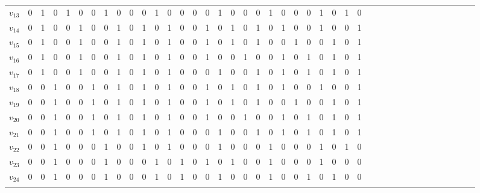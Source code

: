 \begin{table*}
\begin{center}
\begin{tabular}{ccccccccccccccccccccccccccccccccccccccccc}
$v_{13}$&0 & 1 &  0 &  1 &  0 &  0 &  1 &  0 &  0 & 0 & 1 & 0 & 0 & 0 & 0 & 1 & 0 & 0 & 0 & 1 & 0 & 0 & 0 & 1 & 0 & 1 & 0 \\
$v_{14}$&0 & 1 &  0 &  0 &  1 &  0 &  0 &  1 &  0 & 1 & 0 & 1 & 0 & 0 & 1 & 0 & 1 & 0 & 1 & 0 & 1 & 0 & 0 & 1 & 0 & 0 & 1 \\
$v_{15}$&0 & 1 &  0 &  0 &  1 &  0 &  0 &  1 &  0 & 1 & 0 & 1 & 0 & 0 & 1 & 0 & 1 & 0 & 1 & 0 & 0 & 1 & 0 & 0 & 1 & 0 & 1 \\
$v_{16}$&0 & 1 &  0 &  0 &  1 &  0 &  0 &  1 &  0 & 1 & 0 & 1 & 0 & 0 & 1 & 0 & 0 & 1 & 0 & 0 & 1 & 0 & 1 & 0 & 1 & 0 & 1 \\
$v_{17}$&0 & 1 &  0 &  0 &  1 &  0 &  0 &  1 &  0 & 1 & 0 & 1 & 0 & 0 & 0 & 1 & 0 & 0 & 1 & 0 & 1 & 0 & 1 & 0 & 1 & 0 & 1 \\
$v_{18}$&0 & 0 &  1 &  0 &  0 &  1 &  0 &  1 &  0 & 1 & 0 & 1 & 0 & 0 & 1 & 0 & 1 & 0 & 1 & 0 & 1 & 0 & 0 & 1 & 0 & 0 & 1 \\
$v_{19}$&0 & 0 &  1 &  0 &  0 &  1 &  0 &  1 &  0 & 1 & 0 & 1 & 0 & 0 & 1 & 0 & 1 & 0 & 1 & 0 & 0 & 1 & 0 & 0 & 1 & 0 & 1 \\
$v_{20}$&0 & 0 &  1 &  0 &  0 &  1 &  0 &  1 &  0 & 1 & 0 & 1 & 0 & 0 & 1 & 0 & 0 & 1 & 0 & 0 & 1 & 0 & 1 & 0 & 1 & 0 & 1 \\
$v_{21}$&0 & 0 &  1 &  0 &  0 &  1 &  0 &  1 &  0 & 1 & 0 & 1 & 0 & 0 & 0 & 1 & 0 & 0 & 1 & 0 & 1 & 0 & 1 & 0 & 1 & 0 & 1 \\
$v_{22}$&0 & 0 &  1 &  0 &  0 &  0 &  1 &  0 &  0 & 1 & 0 & 1 & 0 & 0 & 0 & 1 & 0 & 0 & 0 & 1 & 0 & 0 & 0 & 1 & 0 & 1 & 0 \\
$v_{23}$&0 & 0 &  1 &  0 &  0 &  0 &  1 &  0 &  0 & 0 & 1 & 0 & 1 & 0 & 1 & 0 & 1 & 0 & 0 & 1 & 0 & 0 & 0 & 1 & 0 & 0 & 0 \\
$v_{24}$&0 & 0 &  1 &  0 &  0 &  0 &  1 &  0 &  0 & 0 & 1 & 0 & 1 & 0 & 0 & 1 & 0 & 0 & 0 & 1 & 0 & 0 & 1 & 0 & 1 & 0 & 0
\\ 
\end{tabular}
 \end{center}
 \end{table*}

